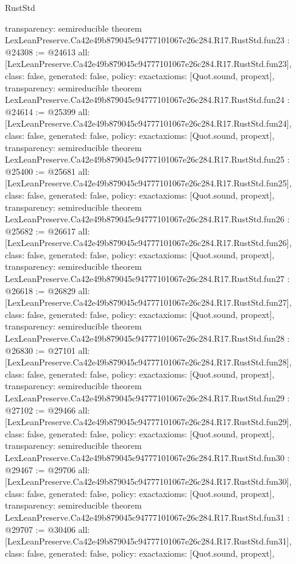 \begin{lexlean}{RustStd}
\begin{coremodule}
{  transparency: semireducible
}
theorem LexLeanPreserve.Ca42e49b879045c94777101067e26c284.R17.RustStd.fun23 : @24308 := @24613 {
  all: [LexLeanPreserve.Ca42e49b879045c94777101067e26c284.R17.RustStd.fun23],
  class: false,
  generated: false,
  policy: exact{axioms: [Quot.sound, propext]},
  transparency: semireducible
}
theorem LexLeanPreserve.Ca42e49b879045c94777101067e26c284.R17.RustStd.fun24 : @24614 := @25399 {
  all: [LexLeanPreserve.Ca42e49b879045c94777101067e26c284.R17.RustStd.fun24],
  class: false,
  generated: false,
  policy: exact{axioms: [Quot.sound, propext]},
  transparency: semireducible
}
theorem LexLeanPreserve.Ca42e49b879045c94777101067e26c284.R17.RustStd.fun25 : @25400 := @25681 {
  all: [LexLeanPreserve.Ca42e49b879045c94777101067e26c284.R17.RustStd.fun25],
  class: false,
  generated: false,
  policy: exact{axioms: [Quot.sound, propext]},
  transparency: semireducible
}
theorem LexLeanPreserve.Ca42e49b879045c94777101067e26c284.R17.RustStd.fun26 : @25682 := @26617 {
  all: [LexLeanPreserve.Ca42e49b879045c94777101067e26c284.R17.RustStd.fun26],
  class: false,
  generated: false,
  policy: exact{axioms: [Quot.sound, propext]},
  transparency: semireducible
}
theorem LexLeanPreserve.Ca42e49b879045c94777101067e26c284.R17.RustStd.fun27 : @26618 := @26829 {
  all: [LexLeanPreserve.Ca42e49b879045c94777101067e26c284.R17.RustStd.fun27],
  class: false,
  generated: false,
  policy: exact{axioms: [Quot.sound, propext]},
  transparency: semireducible
}
theorem LexLeanPreserve.Ca42e49b879045c94777101067e26c284.R17.RustStd.fun28 : @26830 := @27101 {
  all: [LexLeanPreserve.Ca42e49b879045c94777101067e26c284.R17.RustStd.fun28],
  class: false,
  generated: false,
  policy: exact{axioms: [Quot.sound, propext]},
  transparency: semireducible
}
theorem LexLeanPreserve.Ca42e49b879045c94777101067e26c284.R17.RustStd.fun29 : @27102 := @29466 {
  all: [LexLeanPreserve.Ca42e49b879045c94777101067e26c284.R17.RustStd.fun29],
  class: false,
  generated: false,
  policy: exact{axioms: [Quot.sound, propext]},
  transparency: semireducible
}
theorem LexLeanPreserve.Ca42e49b879045c94777101067e26c284.R17.RustStd.fun30 : @29467 := @29706 {
  all: [LexLeanPreserve.Ca42e49b879045c94777101067e26c284.R17.RustStd.fun30],
  class: false,
  generated: false,
  policy: exact{axioms: [Quot.sound, propext]},
  transparency: semireducible
}
theorem LexLeanPreserve.Ca42e49b879045c94777101067e26c284.R17.RustStd.fun31 : @29707 := @30406 {
  all: [LexLeanPreserve.Ca42e49b879045c94777101067e26c284.R17.RustStd.fun31],
  class: false,
  generated: false,
  policy: exact{axioms: [Quot.sound, propext]},
}
\end{coremodule}
\end{lexlean}
